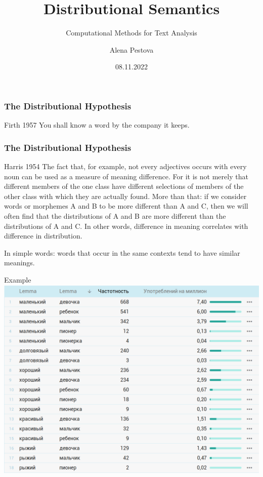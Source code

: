 \documentclass[svgnames]{beamer}
\title[CMTA 06]
{Distributional Semantics}
\subtitle
{Computational Methods for Text Analysis}
\author
{Alena Pestova}
\institute
{HSE Saint-Petersburg}
\date
{08.11.2022}
\begin{document}
    \begin{frame}
        \titlepage
    \end{frame}


    \begin{frame}
        \frametitle{The Distributional Hypothesis}
        \begin{block}{Firth 1957}
            You shall know a word by the company it keeps.
        \end{block}

    \end{frame}

    \begin{frame}
        \frametitle{The Distributional Hypothesis}

        \begin{block}{Harris 1954}
            The fact that, for example, \alert{not every adjectives occurs with every noun} can be used as
            a \alert{measure of meaning difference}. For it is not merely that different members of the
            one class have different selections of members of the other class with which they are
            actually found. More than that: if we consider words or morphemes A and B to
            be more different than A and C, then we will often find that the distributions of A and
            B are more different than the distributions of A and C. In other words, \alert{difference in
            meaning correlates with difference in distribution}.
        \end{block}

        In simple words: words that occur in the same contexts tend to have similar meanings.
    \end{frame}


    \begin{frame}{Example}
        \includegraphics[width=.9\textwidth]{adjectives.png}
    \end{frame}
\end{document}
